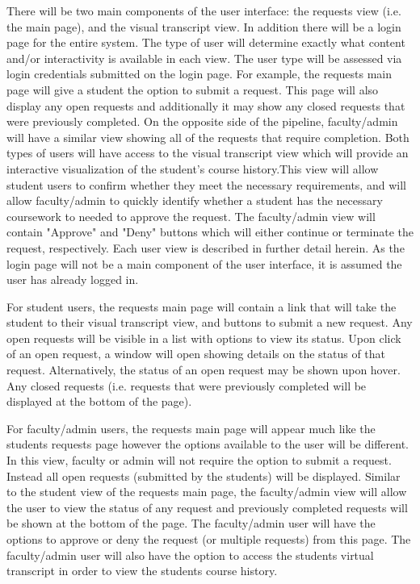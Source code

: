 There will be two main components of the user interface: the requests view (i.e. the main page), and the visual transcript view. In addition there will be a login page for the entire system. The type of user will determine exactly what content and/or interactivity is available in each view. The user type will be assessed via login credentials submitted on the login page. For example, the requests main page will give a student the option to submit a request. This page will also display any open requests and additionally it may show any closed requests that were previously completed. On the opposite side of the pipeline, faculty/admin will have a similar view showing all of the requests that require completion. Both types of users will have access to the visual transcript view which will provide an interactive visualization of the student's course history.This view will allow student users to confirm whether they meet the necessary requirements, and will allow faculty/admin to quickly identify whether a student has the necessary coursework to needed to approve the request. The faculty/admin view will contain "Approve" and "Deny" buttons which will either continue or terminate the request, respectively. Each user view is described in further detail herein. As the login page will not be a main component of the user interface, it is assumed the user has already logged in.

For student users, the requests main page will contain a link that will take the student to their visual transcript view, and buttons to submit a new request. Any open requests will be visible in a list with options to view its status. Upon click of an open request, a window will open showing details on the status of that request. Alternatively, the status of an open request may be shown upon hover. Any closed requests (i.e. requests that were previously completed will be displayed at the bottom of the page). 

For faculty/admin users, the requests main page will appear much like the students requests page however the options available to the user will be different. In this view, faculty or admin will not require the option to submit a request. Instead all open requests (submitted by the students) will be displayed. Similar to the student view of the requests main page, the faculty/admin view will allow the user to view the status of any request and previously completed requests will be shown at the bottom of the page. The faculty/admin user will have the options to approve or deny the request (or multiple requests) from this page. The faculty/admin user will also have the option to access the students virtual transcript in order to view the students course history.

